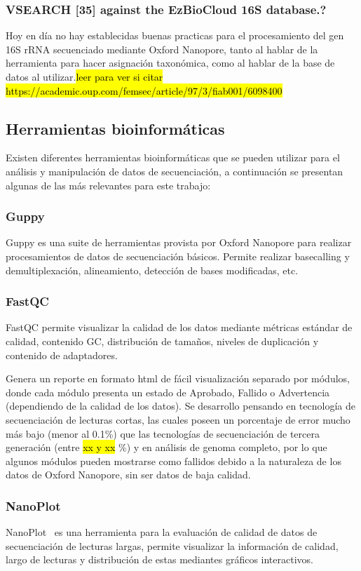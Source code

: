 \subsubsection{VSEARCH [35] against the EzBioCloud 16S database.?}

Hoy en día no hay establecidas buenas practicas para el procesamiento del gen 16S rRNA secuenciado mediante Oxford Nanopore, tanto al hablar de la herramienta para hacer asignación taxonómica, como al hablar de la base de datos al utilizar.\hl{leer para ver si citar https://academic.oup.com/femsec/article/97/3/fiab001/6098400}

\subsection{Herramientas bioinformáticas}
Existen diferentes herramientas bioinformáticas que se pueden utilizar para el análisis y manipulación de datos de secuenciación, a continuación se presentan algunas de las más relevantes para este trabajo:

\subsubsection{Guppy}
Guppy es una suite de herramientas provista por Oxford Nanopore para realizar procesamientos de datos de secuenciación básicos. Permite realizar basecalling y demultiplexación, alineamiento, detección de bases modificadas, etc.
\subsubsection{FastQC}
FastQC\cite{andrews2010fastqc} permite visualizar la calidad de los datos mediante métricas estándar de calidad, contenido GC, distribución de tamaños, niveles de duplicación  y contenido de adaptadores.


Genera un reporte en formato html de fácil visualización separado por módulos, donde cada módulo presenta un estado de Aprobado, Fallido o Advertencia (dependiendo de la calidad de los datos). Se desarrollo pensando en tecnología de secuenciación de lecturas cortas, las cuales poseen un porcentaje de error mucho más bajo (menor al 0.1\%) que las tecnologías de secuenciación de tercera generación (entre \hl{xx y xx} \%) y en análisis de genoma completo, por lo que algunos módulos pueden mostrarse como fallidos debido a la naturaleza de los datos de Oxford Nanopore, sin ser datos de baja calidad.
\subsubsection{NanoPlot}
NanoPlot~\cite{10.1093/bioinformatics/btad311} es una herramienta para la evaluación de calidad de datos de secuenciación de lecturas largas, permite visualizar la información de calidad, largo de lecturas y distribución de estas mediantes gráficos interactivos.

